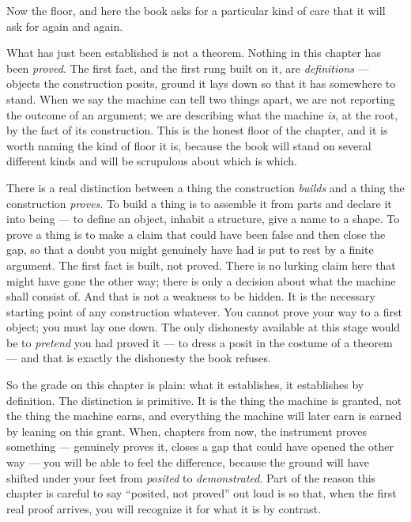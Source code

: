 Now the floor, and here the book asks for a particular kind of care that it will ask for again and again.

What has just been established is not a theorem. Nothing in this chapter has been \emph{proved}. The first fact,
and the first rung built on it, are \emph{definitions} --- objects the construction posits, ground it lays down
so that it has somewhere to stand. When we say the machine can tell two things apart, we are not reporting the
outcome of an argument; we are describing what the machine \emph{is}, at the root, by the fact of its
construction. This is the honest floor of the chapter, and it is worth naming the kind of floor it is, because
the book will stand on several different kinds and will be scrupulous about which is which.

There is a real distinction between a thing the construction \emph{builds} and a thing the construction
\emph{proves}. To build a thing is to assemble it from parts and declare it into being --- to define an object,
inhabit a structure, give a name to a shape. To prove a thing is to make a claim that could have been false and
then close the gap, so that a doubt you might genuinely have had is put to rest by a finite argument. The first
fact is built, not proved. There is no lurking claim here that might have gone the other way; there is only a
decision about what the machine shall consist of. And that is not a weakness to be hidden. It is the necessary
starting point of any construction whatever. You cannot prove your way to a first object; you must lay one down.
The only dishonesty available at this stage would be to \emph{pretend} you had proved it --- to dress a posit in
the costume of a theorem --- and that is exactly the dishonesty the book refuses.

So the grade on this chapter is plain: what it establishes, it establishes by definition. The distinction is
primitive. It is the thing the machine is granted, not the thing the machine earns, and everything the machine
will later earn is earned by leaning on this grant. When, chapters from now, the instrument proves something ---
genuinely proves it, closes a gap that could have opened the other way --- you will be able to feel the
difference, because the ground will have shifted under your feet from \emph{posited} to \emph{demonstrated}. Part
of the reason this chapter is careful to say ``posited, not proved'' out loud is so that, when the first real
proof arrives, you will recognize it for what it is by contrast.

